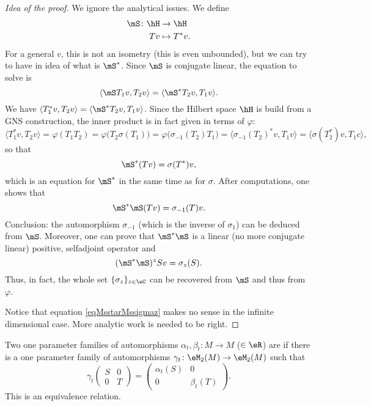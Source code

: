 \begin{proof}[Idea of the proof]
We ignore the analytical issues.  We define
\begin{equation}	
	\begin{aligned}
		\mS\colon \hH&\to \hH \\
		Tv&\mapsto T^*v. 
	\end{aligned}
\end{equation}
For a general $v$, this is not an isometry (this is even unbounded), but we can try to have in idea of what is $\mS^*$. Since $\mS$ is conjugate linear, the equation to solve is
\begin{equation}
	\langle \mS T_1v, T_2v\rangle =\langle \mS^*T_2v, T_1v\rangle .
\end{equation}
We have $\langle T_1^*v, T_2v\rangle =\langle \mS^*T_2v, T_1v\rangle $. Since the Hilbert space $\hH$ is build from a GNS construction, the inner product is in fact given in terms of $\varphi$:
\begin{equation}
	\langle T_1^*v, T_2v\rangle =\varphi(T_1T_2)=\varphi\big( T_2\sigma(T_1) \big)=\varphi\big( \sigma_{-1}(T_2)T_1 \big)=\langle \sigma_{-1}(T_2)^*v, T_1v\rangle =\langle \sigma(T_2^*)v, T_1c\rangle,
\end{equation}
so that
\begin{equation}
	\mS^*(Tv)=\sigma(T^*)v,
\end{equation}
which is an equation for $\mS^*$ in the same time as for $\sigma$. After computations, one shows that
\begin{equation}
	\mS^*\mS(Tv)=\sigma_{-1}(T)v.
\end{equation}
Conclusion: the automorphism $\sigma_{-1}$ (which is the inverse of $\sigma_1$) can be deduced from $\mS$. Moreover, one can prove that $\mS^*\mS$ is a linear (no more conjugate linear) positive, selfadjoint operator and
\begin{equation}		\label{eqMsstarMssigmaz}
	(\mS^*\mS)^zSv=\sigma_z(S).
\end{equation}
Thus, in fact, the whole set $\{ \sigma_z \}_{z\in\eC}$ can be recovered from $\mS$ and thus from $\varphi$.

Notice that equation \eqref{eqMsstarMssigmaz} makes no sense in the infinite dimensional case. More analytic work is needed to be right.

\end{proof}

Two one parameter families of automorphisms $\alpha_t,\beta_t\colon M\to M$ ($\in \eR$) are  if there is a one parameter family of automorphisms $\gamma_t\colon \eM_2(M)\to \eM_2(M)$ such that
\begin{equation}
		\gamma_t
	\begin{pmatrix}
	  S	&	0	\\ 
	  0	&	T	
	\end{pmatrix}
	=
	\begin{pmatrix}
	  \alpha_t(S)	&	0	\\ 
	  0	&	\beta_t(T)	
	\end{pmatrix}.
\end{equation}
This is an equivalence relation.

